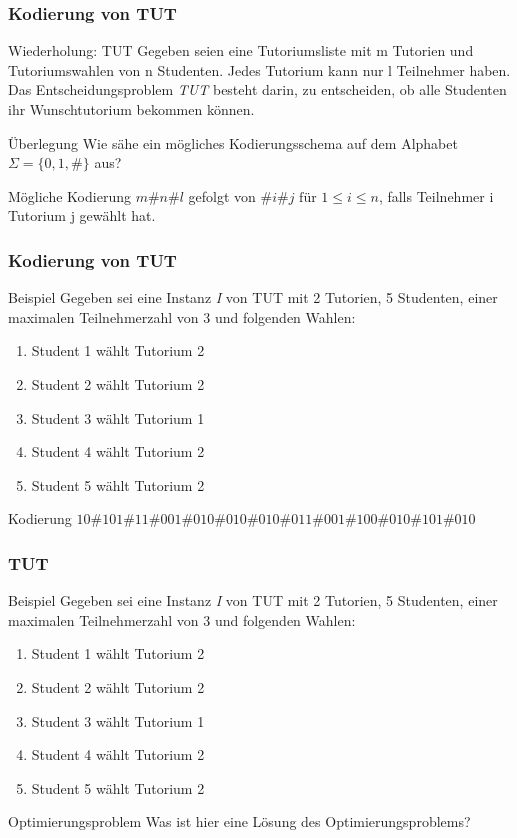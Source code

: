 \documentclass{beamer}
\begin{document}
\begin{frame}
\frametitle{Kodierung von TUT}
 \begin{block}{Wiederholung: TUT}
  Gegeben seien eine Tutoriumsliste mit m Tutorien und Tutoriumswahlen von n Studenten. Jedes Tutorium kann nur l Teilnehmer haben.
 Das Entscheidungsproblem \textit{TUT} besteht darin, zu entscheiden, ob alle Studenten ihr Wunschtutorium bekommen können.
 \end{block}
 \begin{block}{Überlegung}
 Wie sähe ein mögliches Kodierungsschema auf dem Alphabet $\Sigma = \{0,1,\#\}$ aus?
 \end{block}
 \pause
 \begin{block}{Mögliche Kodierung}
 $m\#n\#l$ gefolgt von $\#i\#j \mbox{ für } 1 \leq i \leq n$, falls Teilnehmer i Tutorium j gewählt hat.
 \end{block}
\end{frame}

\begin{frame}
\frametitle{Kodierung von TUT}
\begin{block}{Beispiel}
 Gegeben sei eine Instanz \textit{I} von TUT mit 2 Tutorien, 5 Studenten, einer maximalen Teilnehmerzahl von 3 und folgenden Wahlen:
 \begin{enumerate}
  \item Student 1 wählt Tutorium 2
  \item Student 2 wählt Tutorium 2
  \item Student 3 wählt Tutorium 1
  \item Student 4 wählt Tutorium 2
  \item Student 5 wählt Tutorium 2
 \end{enumerate}
\end{block}
\pause
\begin{block}{Kodierung}
$10\#101\#11 \#001\#010 \#010\#010 \#011\#001 \#100\#010 \#101\#010$
\end{block}
\end{frame}

\begin{frame}
\frametitle{TUT}
\begin{block}{Beispiel}
 Gegeben sei eine Instanz \textit{I} von TUT mit 2 Tutorien, 5 Studenten, einer maximalen Teilnehmerzahl von 3 und folgenden Wahlen:
 \begin{enumerate}
  \item Student 1 wählt Tutorium 2
  \item Student 2 wählt Tutorium 2
  \item Student 3 wählt Tutorium 1
  \item Student 4 wählt Tutorium 2
  \item Student 5 wählt Tutorium 2
 \end{enumerate}
\end{block}
\begin{block}{Optimierungsproblem}
 Was ist hier eine Lösung des Optimierungsproblems? 
\end{block}
\end{frame}
\end{document}
